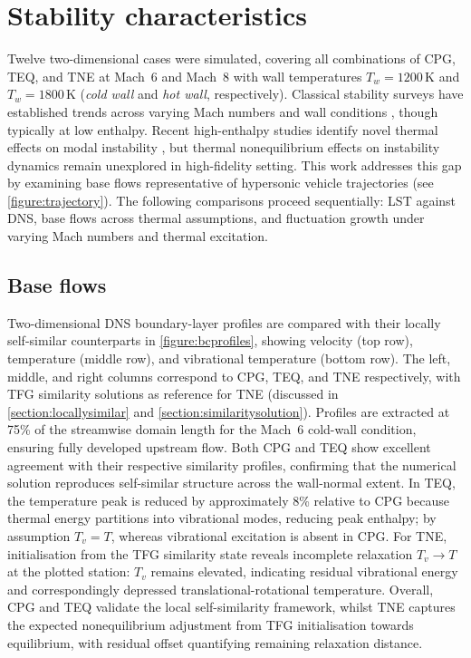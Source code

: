 \section{Stability characteristics}

Twelve two-dimensional cases were simulated, covering all combinations of \gls{CPG}, \gls{TEQ}, and \gls{TNE} at Mach~6 and Mach~8 with wall temperatures $T_w=1200\,\mathrm{K}$ and $T_w=1800\,\mathrm{K}$ (\emph{cold wall} and \emph{hot wall}, respectively). Classical stability surveys have established trends across varying Mach numbers and wall conditions \citep{Mack1969,Mack1984,Malik1989,MasadEtAl1992}, though typically at low enthalpy. Recent high-enthalpy studies identify novel thermal effects on modal instability \citep{Bitter2015}, but thermal nonequilibrium effects on instability dynamics remain unexplored in high-fidelity setting. This work addresses this gap by examining base flows representative of hypersonic vehicle trajectories (see \cref{figure:trajectory}). The following comparisons proceed sequentially: \gls{LST} against \gls{DNS}, base flows across thermal assumptions, and fluctuation growth under varying Mach numbers and thermal excitation.


\subsection{Base flows}
Two-dimensional \gls{DNS} boundary-layer profiles are compared with their locally self-similar counterparts in \cref{figure:bcprofiles}, showing velocity (top row), temperature (middle row), and vibrational temperature (bottom row). The left, middle, and right columns correspond to \gls{CPG}, \gls{TEQ}, and \gls{TNE} respectively, with \gls{TFG} similarity solutions as reference for \gls{TNE} (discussed in \cref{section:locallysimilar} and \cref{section:similaritysolution}). Profiles are extracted at 75\% of the streamwise domain length for the Mach~6 cold-wall condition, ensuring fully developed upstream flow. Both \gls{CPG} and \gls{TEQ} show excellent agreement with their respective similarity profiles, confirming that the numerical solution reproduces self-similar structure across the wall-normal extent. In \gls{TEQ}, the temperature peak is reduced by approximately 8\% relative to \gls{CPG} because thermal energy partitions into vibrational modes, reducing peak enthalpy; by assumption $T_v=T$, whereas vibrational excitation is absent in \gls{CPG}. For \gls{TNE}, initialisation from the \gls{TFG} similarity state reveals incomplete relaxation $T_v\!\to\!T$ at the plotted station: $T_v$ remains elevated, indicating residual vibrational energy and correspondingly depressed translational-rotational temperature. Overall, \gls{CPG} and \gls{TEQ} validate the local self-similarity framework, whilst \gls{TNE} captures the expected nonequilibrium adjustment from \gls{TFG} initialisation towards equilibrium, with residual offset quantifying remaining relaxation distance.

